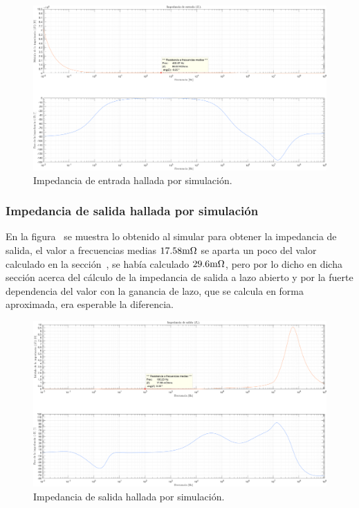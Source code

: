 \begin{figure}[H] %
\begin{center}
\includegraphics[width=0.9 \textwidth, angle=90]{./img/puntos/P11b_Ri.png}
\caption{\label{fig:fig_simulated_zi}\footnotesize{Impedancia de entrada hallada por simulación.}}
\end{center}
\end{figure}



\clearpage

\subsubsection{Impedancia de salida hallada por simulación}

En la figura~ se muestra lo obtenido al simular para obtener la impedancia de salida, el valor a frecuencias medias $17.58 \si[per-mode=symbol]{\milli\ohm}$ se aparta un poco del valor calculado en la sección~, se había calculado $29.6 \si[per-mode=symbol]{\milli\ohm}$, pero por lo dicho en dicha sección acerca del cálculo de la impedancia de salida a lazo abierto y por la fuerte dependencia del valor con la ganancia de lazo, que se calcula en forma aproximada, era esperable la diferencia.


\begin{figure}[H] %
\begin{center}
\includegraphics[width=0.9 \textwidth, angle=90]{./img/puntos/P11c_Ro.png}
\caption{\label{fig:fig_simulated_zo}\footnotesize{Impedancia de salida hallada por simulación.}}
\end{center}
\end{figure}



